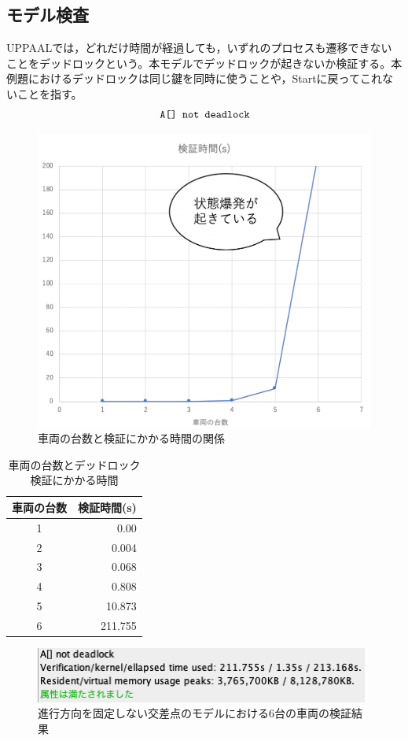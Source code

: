 \documentclass{tpu-sotu}
\begin{document}
	\subsection{モデル検査}
	UPPAALでは，どれだけ時間が経過しても，いずれのプロセスも遷移できないことをデッドロックという。本モデルでデッドロックが起きないか検証する。本例題におけるデッドロックは同じ鍵を同時に使うことや，Startに戻ってこれないことを指す。
	\[
	\mbox{\tt{A[] not deadlock}}
	\]
	\begin{figure}[htbp]
	\centering
	\includegraphics[width=120mm]{IntersectionVerificationTime.png}
	\caption{車両の台数と検証にかかる時間の関係}
	\label{IVT}
	\end{figure}
	\begin{table}[htb]
	\centering
	\caption{車両の台数とデッドロック検証にかかる時間}
	 \begin{tabular}{|c|r|} \hline
	    車両の台数 & 検証時間(s)  \\ \hline
	   1& 0.00  \\ \hline
	   2 & 0.004 \\ \hline
	   3 & 0.068 \\ \hline
	   4 & 0.808 \\ \hline
	   5 & 10.873 \\ \hline
	   6 & 211.755\\ \hline
	 \end{tabular}
	 \label{testcase}
	\end{table}

	\begin{figure}[htbp]
	\centering
	\includegraphics[width=110mm]{InterBigCar6.png}
	\caption{進行方向を固定しない交差点のモデルにおける6台の車両の検証結果}
	\label{IBC6}
	\end{figure}
\end{document}
